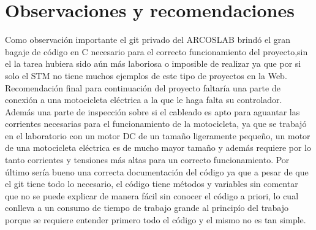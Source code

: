 \documentclass[letterpaper]{article}
\begin{document}
\section{Observaciones y recomendaciones}
Como observación importante el git privado del ARCOSLAB brindó el gran bagaje de código en C necesario para el correcto funcionamiento del proyecto,sin el la tarea hubiera sido aún más laboriosa o imposible de realizar
ya que por si solo el STM no tiene muchos ejemplos de este tipo de proyectos en la Web. 
Recomendación final para continuación del proyecto faltaría una parte de conexión a una motocicleta eléctrica a la que le haga falta su controlador.
Además una parte de inspección sobre si el cableado es apto para aguantar las corrientes necesarias para el funcionamiento de la motocicleta, ya que se trabajó en el laboratorio con un
motor DC de un tamaño ligeramente pequeño, un motor de una motocicleta eléctrica es de mucho mayor tamaño y además requiere por lo tanto corrientes y tensiones más altas para un correcto funcionamiento.
Por último sería bueno una correcta documentación del código ya que a pesar de que el git tiene todo lo necesario, el código tiene métodos y variables sin comentar que no se puede explicar de manera fácil sin conocer el código a priori, lo cual
conlleva a un consumo de tiempo de trabajo grande al principío del trabajo porque se requiere entender primero todo el código y el mismo no es tan simple.

 

\end{document}
